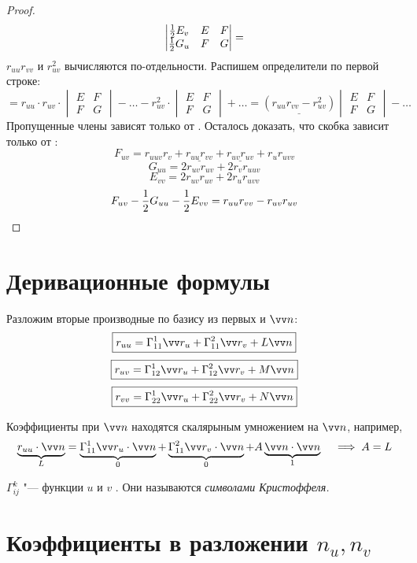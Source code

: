 \begin{proof}
$$\begin{vmatrix}
		\frac{1}2 E_v & E & F \\
		\frac{1}2 G_u & F & G
	\end{vmatrix} = $$
	$ r_{uu}r_{vv} $ и $ r_{uv}^2 $  вычисляются по-отдельности. Распишем определители по первой строке:
	$$ = r_{uu} \cdot r_{uv} \cdot
	\begin{vmatrix}
		E & F \\
		F & G
	\end{vmatrix} - \dots - r_{uv}^2 \cdot
	\begin{vmatrix}
		E & F \\
		F & G
	\end{vmatrix} + \dots = \underline{(r_{uu}r_{vv} - r_{uv}^2)}
	\begin{vmatrix}
		E & F \\
		F & G
	\end{vmatrix} - \dots $$
	Пропущенные члены зависят только от . Осталось доказать, что скобка зависит только от :
	$$ F_{uv} = r_{uuv}r_v + \underline{r_{uu}r_{vv}} + \underline{r_{uv}r_{uv}} + r_ur_{uvv} $$
	$$ G_{uu} = 2r_{uv}r_{uv} + 2r_vr_{uuv} $$
	$$ E_{vv} = 2r_{uv}r_{uv} + 2r_ur_{uvv} $$
	$$ F_{uv} - \frac{1}2 G_{uu} - \frac{1}2 E_{vv} = r_{uu}r_{vv} - r_{uv}r_{uv} $$
\end{proof}

\section{Деривационные формулы}

Разложим вторые производные по базису из первых и $ \vv n $:
$$ \boxed{r_{uu} = \Gamma_{11}^1 \vv r_u + \Gamma_{11}^2 \vv r_v + L \vv n} $$
$$ \boxed{r_{uv} = \Gamma_{12}^1 \vv r_u + \Gamma_{12}^2 \vv r_v + M \vv n} $$
$$ \boxed{r_{vv} = \Gamma_{22}^1 \vv r_u + \Gamma_{22}^2 \vv r_v + N \vv n} $$

Коэффициенты при $ \vv n $ находятся скалярыным умножением на $ \vv n $, например,
$$ \underbrace{r_{uu} \cdot \vv n}_L = \underbrace{\Gamma_{11}^1 \vv r_u \cdot \vv n}_0 + \underbrace{\Gamma_{11}^2 \vv r_v \cdot \vv n}_0 + A \underbrace{\vv n \cdot \vv n}_1 \quad \implies A = L $$

$ \Gamma_{ij}^k $ "--- функции $ u $ и $ v $ . Они называются \it{символами Кристоффеля}.

\section{Коэффициенты в разложении \texorpdfstring{$ n_u, n_v $}{nu, nv}}

